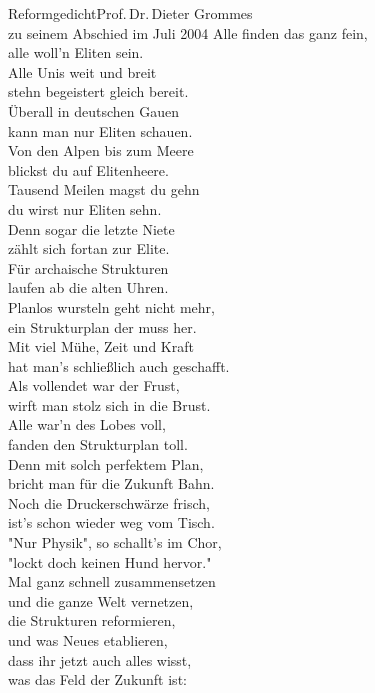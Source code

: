 \begin{lied*}{Reformgedicht}{Prof.\,Dr.\,Dieter Grommes\\zu seinem Abschied im Juli 2004}
Alle finden das ganz fein,\\
alle woll'n Eliten sein.\\
Alle Unis weit und breit\\
stehn begeistert gleich bereit.\\

Überall in deutschen Gauen\\
kann man nur Eliten schauen.\\
Von den Alpen bis zum Meere\\
blickst du auf Elitenheere.\\
Tausend Meilen magst du gehn\\
du wirst nur Eliten sehn.\\
Denn sogar die letzte Niete\\
zählt sich fortan zur Elite.\\

Für archaische Strukturen\\
laufen ab die alten Uhren.\\
Planlos wursteln geht nicht mehr,\\
ein Strukturplan der muss her.\\
Mit viel Mühe, Zeit und Kraft\\
hat man's schließlich auch geschafft.\\
Als vollendet war der Frust,\\
wirft man stolz sich in die Brust.\\
Alle war'n des Lobes voll,\\
fanden den Strukturplan toll.\\
Denn mit solch perfektem Plan,\\
bricht man für die Zukunft Bahn.\\

Noch die Druckerschwärze frisch,\\
ist's schon wieder weg vom Tisch.\\
"Nur Physik", so schallt's im Chor,\\
"lockt doch keinen Hund hervor."\\
Mal ganz schnell zusammensetzen\\
und die ganze Welt vernetzen,\\
die Strukturen reformieren,\\
und was Neues etablieren,\\
dass ihr jetzt auch alles wisst,\\
was das Feld der Zukunft ist:\\


\end{lied*}
